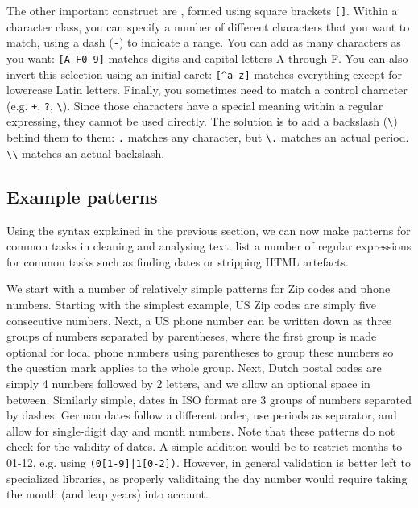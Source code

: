 The other important construct are , formed using square brackets \verb|[]|.
Within a character class, you can specify a number of different characters that you want to match, using a dash (\verb|-|) to indicate a range.
You can add as many characters as you want: \verb|[A-F0-9]| matches digits and capital letters A through F.
You can also invert this selection using an initial caret: \verb|[^a-z]| matches everything except for lowercase Latin letters.
Finally, you sometimes need to match a control character  (e.g. \verb!+!, \verb|?|, \verb|\|). Since those characters have a special meaning within a regular expressing, they cannot be used directly. The solution is to add a backslash (\verb|\|) behind them to  them:
\verb|.| matches any character, but \verb|\.| matches an actual period. \verb|\\| matches an actual backslash.

\subsection{Example patterns}

Using the syntax explained in the previous section, we can now make patterns for common tasks in cleaning and analysing text.
 list a number of regular expressions for common tasks such as finding dates or stripping HTML artefacts.



We start with a number of relatively simple patterns for Zip codes and phone numbers.
Starting with the simplest example, US Zip codes are simply five consecutive numbers.
Next, a US phone number can be written down as three groups of numbers separated by parentheses,
where the first group is made optional for local phone numbers using parentheses to group these numbers so the question mark applies to the whole group. 
Next, Dutch postal codes are simply 4 numbers followed by 2 letters, and we allow an optional space in between.
Similarly simple, dates in ISO format are 3 groups of numbers separated by dashes.
German dates follow a different order, use periods as separator, and allow for single-digit day and month numbers.
Note that these patterns do not check for the validity of dates.
A simple addition would be to restrict months to 01-12, e.g. using \verb!(0[1-9]|1[0-2])!.
However, in general validation is better left to specialized libraries, as properly validitaing the day number would require taking the month (and leap years) into account. 

